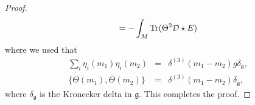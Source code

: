 \documentclass[letterpaper,12pt]{article}
\newcommand{\nn}{\nonumber}
\def\d{\delta}
\def\cd{{\cal D}}
\begin{document}
\begin{proof}
\begin{equation*}
=- \int_M \mbox{Tr} (\Theta^2  \cd\star {E} ) 
\end{equation*}
where we used that 
\begin{eqnarray}
\sum_i {\eta}_i(m_1) {\eta}_i(m_2) &=& \d^{(3)}(m_1 - m_2)g \d_{\mathfrak{g}},
\nn\\
\{\Theta(m_1), \bar{\Theta}(m_2)\} &=& \d^{(3)}(m_1-m_2) \d_{\mathfrak{g}},
\nn
\end{eqnarray}
where $\d_{\mathfrak{g}}$ is the Kronecker delta in $\mathfrak{g}$.
This completes the proof.
\end{proof}
\end{document}

